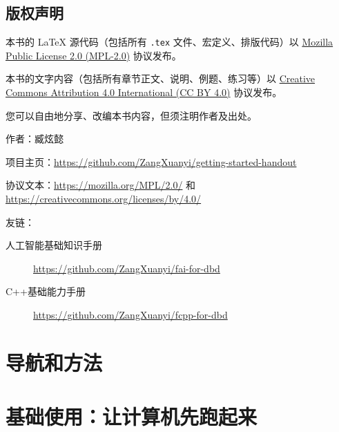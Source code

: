 \documentclass[openany,fontset=none, oneside]{ctexbook}
\begin{document}
\maketitle

\chapter*{版权声明}
    
\vspace{1em}

本书的 LaTeX 源代码（包括所有 \texttt{.tex} 文件、宏定义、排版代码）以 \href{https://mozilla.org/MPL/2.0/}{Mozilla Public License 2.0 (MPL-2.0)} 协议发布。

本书的文字内容（包括所有章节正文、说明、例题、练习等）以 \href{https://creativecommons.org/licenses/by/4.0/}{Creative Commons Attribution 4.0 International (CC BY 4.0)} 协议发布。

您可以自由地分享、改编本书内容，但须注明作者及出处。

作者：臧炫懿 

项目主页：\url{https://github.com/ZangXuanyi/getting-started-handout}

协议文本：\url{https://mozilla.org/MPL/2.0/} 和 \url{https://creativecommons.org/licenses/by/4.0/}

友链：
\begin{description}
    \item[人工智能基础知识手册] \url{https://github.com/ZangXuanyi/fai-for-dbd}
    \item[C++基础能力手册] \url{https://github.com/ZangXuanyi/fcpp-for-dbd} 
\end{description}

\frontmatter



\mainmatter
\begin{small}
    \hypersetup{linkcolor=black}
    \tableofcontents
\end{small}

\part{导航和方法}



\part{基础使用：让计算机先跑起来}




\end{document}
